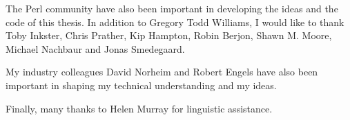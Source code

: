 The Perl community have also been important in developing the ideas
and the code of this thesis. In addition to Gregory Todd Williams, I
would like to thank Toby Inkster, Chris Prather, Kip Hampton, Robin
Berjon, Shawn M.  Moore, Michael Nachbaur and Jonas Smedegaard.

My industry colleagues David Norheim and Robert Engels have
also been important in shaping my technical understanding and my
ideas.

Finally, many thanks to Helen Murray for linguistic assistance.
